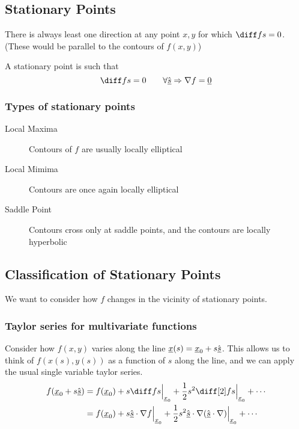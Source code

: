 \documentclass{article}
\begin{document}
\subsection{Stationary Points}
There is always least one direction at any point $x, y$ for which $\diff fs = 0$. (These would be parallel to the contours of $f(x, y)$)

\begin{defi}
    A stationary point is such that
    \[
        \diff fs = 0 \qquad \forall \uvec s \Rightarrow \nabla f = \vec 0
    \]
\end{defi}

\subsubsection*{Types of stationary points}

\begin{description}
    \item[Local Maxima] Contours of $f$ are usually locally elliptical
    \item[Local Mimima] Contours are once again locally elliptical
    \item[Saddle Point] Contours cross only at saddle points, and the contours are locally hyperbolic
\end{description}

\subsection{Classification of Stationary Points}
We want to consider how $f$ changes in the vicinity of stationary points.

\subsubsection{Taylor series for multivariate functions}
Consider how $f(x, y)$ varies along the line $\underline{x} (s) = \underline{x}_0 + s \hat{\underline{s}}$.
This allows us to think of $f(x(s), y(s))$ as a function of $s$ along the line, and we can apply the usual single variable taylor series.
\begin{align*}
    f(\vec x_0 + s \uvec s) &= f(\vec x_0) + s \diff fs \eval_{\vec x_0}{} + \frac{1}{2} s^2 \diff[2] fs \eval_{\vec x_0}{} + \cdots \\
    &= f(\vec x_0) + s \uvec s \cdot \nabla f \eval_{\vec x_0}{} + \frac{1}{2} s^2 \uvec s \cdot \nabla(\uvec s \cdot \nabla) \eval_{\vec x_0}{} + \cdots
\end{align*}
\end{document}
